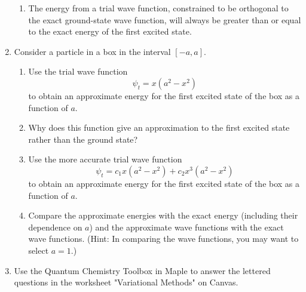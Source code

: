 \documentclass[../psets.tex]{subfiles}
\begin{document}
\begin{enumerate}
\begin{enumerate}
        \item The energy from a trial wave function, constrained to be orthogonal to the exact ground-state wave function, will always be greater than or equal to the exact energy of the first excited state.
    \end{enumerate}
    \item Consider a particle in a box in the interval $[-a,a]$.
    \begin{enumerate}
        \item Use the trial wave function
        \begin{equation*}
            \psi_t = x(a^2-x^2)
        \end{equation*}
        to obtain an approximate energy for the first excited state of the box as a function of $a$.
        \item Why does this function give an approximation to the first excited state rather than the ground state?
        \item Use the more accurate trial wave function
        \begin{equation*}
            \psi_t = c_1x(a^2-x^2)+c_2x^3(a^2-x^2)
        \end{equation*}
        to obtain an approximate energy for the first excited state of the box as a function of $a$.
        \item Compare the approximate energies with the exact energy (including their dependence on $a$) and the approximate wave functions with the exact wave functions. (Hint: In comparing the wave functions, you may want to select $a=1$.)
    \end{enumerate}
    \item Use the Quantum Chemistry Toolbox in Maple to answer the lettered questions in the worksheet "Variational Methods" on Canvas.
\end{enumerate}
\end{document}
